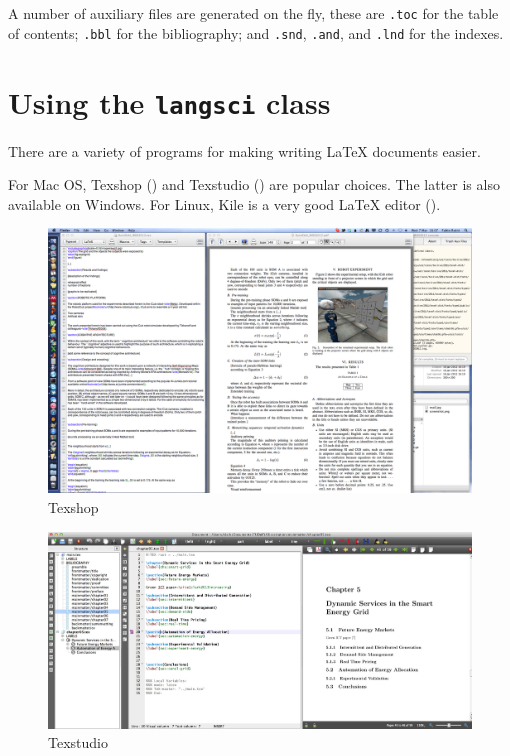 A number of auxiliary files are generated on the fly, these are  \verb+.toc+ for the table of contents; \verb+.bbl+ for the bibliography; and \verb+.snd+, \verb+.and+, and \verb+.lnd+ for the indexes.  

\section{Using the \texttt{langsci} class}
There are a variety of programs for making writing \LaTeX\xspace documents easier.

For Mac OS, Texshop () and Texstudio () are popular choices. The latter is also available on Windows.
For Linux, Kile is a very good \LaTeX\xspace editor ().



\begin{figure}
\includegraphics[height=.4\textheight]{texshop.png}
\caption{Texshop}
\label{fig:latex:texshop} 
\end{figure}

\begin{figure}
\includegraphics[width=\textwidth]{texstudio.jpg}
\caption{Texstudio}
\label{fig:latex:texstudio} 
\end{figure}


